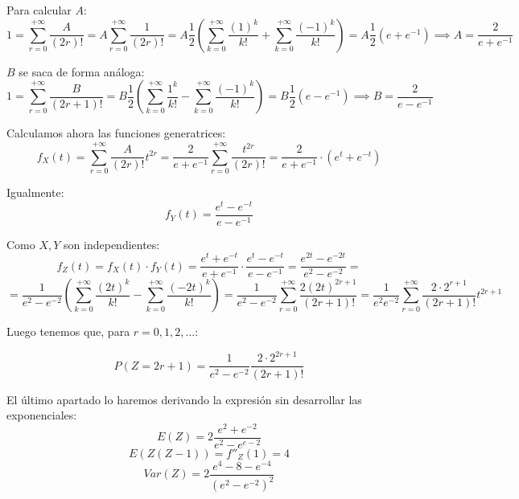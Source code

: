 \documentclass[openany]{book}
\begin{document}
\begin{exercise}
    $  $ \\ 

    Para calcular $ A $:
    $$ 1 = \sum\limits_{r=0}^{+\infty} \dfrac{A}{(2r)!} = A \sum\limits_{r=0}^{+\infty}\dfrac{1}{(2r)!} = A \dfrac{1}{2} \left(\sum\limits_{k=0}^{+\infty} \dfrac{(1)^{k}}{k!}+ \sum\limits_{k=0}^{+\infty} \dfrac{(-1)^{k}}{k!} \right) = A \dfrac{1}{2} (e+e^{-1}) \implies A = \dfrac{2}{e+e ^{-1}} $$

    $ B $ se saca de forma análoga:
    $$ 1 = \sum\limits_{r=0}^{+\infty} \dfrac{B}{(2r+1)!} = B \dfrac{1}{2}\left( \sum\limits_{k=0}^{+\infty}\dfrac{1^{k}}{k!} - \sum\limits_{k=0}^{+\infty} \dfrac{(-1)^{k}}{k!} \right) = B \dfrac{1}{2}(e-e ^{-1}) \implies B = \dfrac{2}{e-e ^{-1}} $$

    Calculamos ahora las funciones generatrices:
    $$ f_{X}(t) = \sum\limits_{r=0}^{+\infty} \dfrac{A}{(2r)!} t ^{2r} = \dfrac{2}{e+e ^{-1}} \sum\limits_{r=0}^{+\infty} \dfrac{t ^{2r}}{(2r)!} = \dfrac{2}{e + e ^{-1}}\cdot (e ^{t}+e^{-t})$$

    Igualmente:
    $$ f_{Y}(t) = \dfrac{e^{t}-e^{-t}}{e-e ^{-1}} $$

    Como $ X,Y $ son independientes:
    $$ f_{Z}(t) = f_{X}(t)\cdot f_{Y}(t) = \dfrac{e^{t}+e^{-t}}{e+e ^{-1}} \cdot \dfrac{e^{t}-e^{-t}}{e-e ^{-1}} = \dfrac{e^{2t}-e^{-2t}}{e^2-e^{-2}} = $$
    $$=  \dfrac{1}{e^2-e^{-2}} \left( \sum\limits_{k=0}^{+\infty} \dfrac{(2t)^{k}}{k!} - \sum\limits_{k=0}^{+\infty} \dfrac{(-2t)^{k}}{k!} \right) = \dfrac{1}{e^2-e^{-2}} \sum\limits_{r=0}^{+\infty} \dfrac{2(2t)^{2r+1}}{(2r+1)!} = \dfrac{1}{e^2e^{-2}} \sum\limits_{r=0}^{+\infty} \dfrac{2\cdot 2^{r+1}}{(2r+1)!} t ^{2r+1}  $$

    Luego tenemos que, para $ r=0,1,2,... $:

    $$ P(Z=2r+1) = \dfrac{1}{e^2-e^{-2}} \dfrac{2\cdot 2^{2r+1}}{(2r+1)!} $$

    El último apartado lo haremos derivando la expresión sin desarrollar las exponenciales:
    $$ E(Z) = 2 \dfrac{e^2+e^{-2}}{e^2-e^{e-2}} $$
    $$ E(Z(Z-1)) = f''_{Z}(1) = 4 $$
    $$ Var(Z) = 2 \dfrac{e^{4}-8-e^{-4}}{(e^2-e^{-2})^2} $$

\end{exercise}
\end{document}
